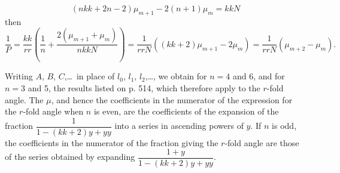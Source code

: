 \[
(nkk+2n-2)\mu_{m+1}-2(n+1)\mu_m=kkN
\]
\noindent then
\[
\frac1P=\frac{kk}{rr}\left(\frac1n+\frac{2(\mu_{m+1}+\mu_m)}{nkkN}\right)
=\frac1{rrN}((kk+2)\mu_{m+1}-2\mu_m)=\frac1{rrN}(\mu_{m+2}-\mu_m).
\]
\par\noindent\hspace*{\parindent}Writing $A$, $B$, $C$,\ldots\ in place of $l_0$, $l_1$, $l_2$,\ldots, we obtain for $n=4$ and 6, and for $n=3$ and 5, the results listed on p. 514, which therefore apply to the $r$-fold angle. The $\mu$, and hence the coefficients in the numerator of the expression for the $r$-fold angle when $n$ is even, are the coefficients of the expansion of the fraction $\dfrac1{1-(kk+2)y+yy}$ into a series in ascending powers of $y$. If $n$ is odd, the coefficients in the numerator of the fraction giving the $r$-fold angle are those of the series obtained by expanding $\dfrac{1+y}{1-(kk+2)y+yy}$.
\par\endgroup
